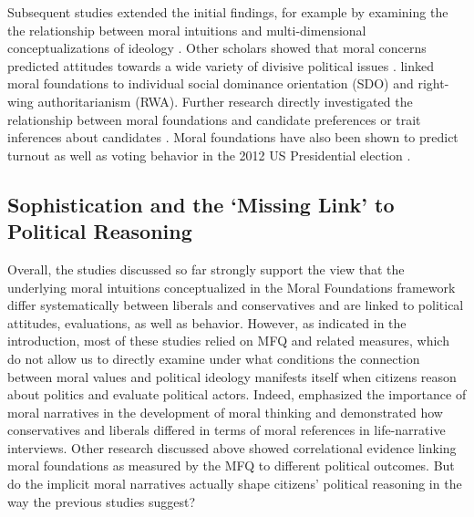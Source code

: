 \documentclass[12pt]{paper}
\begin{document}
Subsequent studies extended the initial findings, for example by examining the the relationship between moral intuitions and multi-dimensional conceptualizations of ideology \citep[c.f.][]{haidt2009above}.  Other scholars showed that moral concerns predicted attitudes towards a wide variety of divisive political issues \citep[e.g.][]{koleva2012tracing,low2015moral}. \citet{federico2013mapping} linked moral foundations to individual social dominance orientation (SDO) and right-wing authoritarianism (RWA). Further research directly investigated the relationship between moral foundations and candidate preferences \citep{iyer2010beyond} or trait inferences about candidates \citep{clifford2014linking}. Moral foundations have also been shown to predict turnout \citep{johnson2014ideology} as well as voting behavior in the 2012 US Presidential election \citep{franks2015using}.


\subsection{Sophistication and the `Missing Link' to Political Reasoning}

Overall, the studies discussed so far strongly support the view that the underlying moral intuitions conceptualized in the Moral Foundations framework differ systematically between liberals and conservatives and are linked to political attitudes, evaluations, as well as behavior. However, as indicated in the introduction, most of these studies relied on MFQ and related measures, which do not allow us to directly examine under what conditions the connection between moral values and political ideology manifests itself when citizens reason about politics and evaluate political actors. Indeed, \citet{haidt2008moral} emphasized the importance of moral narratives in the development of moral thinking and \citet{mcadams2008family} demonstrated how conservatives and liberals differed in terms of moral references in life-narrative interviews. Other research discussed above showed correlational evidence linking moral foundations as measured by the MFQ to different political outcomes. But do the implicit moral narratives actually shape citizens' political reasoning in the way the previous studies suggest?
\end{document}
